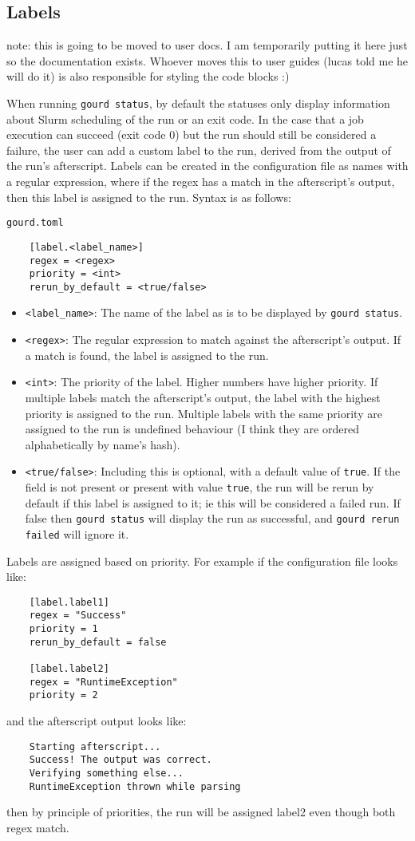 \subsection{Labels}
note: this is going to be moved to user docs.
I am temporarily putting it here just so the documentation exists.
Whoever moves this to user guides (lucas told me he will do it) is also responsible for styling the code blocks :)

When running \verb|gourd status|, by default the statuses only display information about Slurm scheduling of the run or an exit code.
In the case that a job execution can succeed (exit code 0) but the run should still be considered a failure, the user can add a custom label to the run, derived from the output of the run's afterscript.
Labels can be created in the configuration file as names with a regular expression, where if the regex has a match in the afterscript's output, then this label is assigned to the run.
Syntax is as follows:

\texttt{gourd.toml}
\begin{verbatim}
    [label.<label_name>]
    regex = <regex>
    priority = <int>
    rerun_by_default = <true/false>
\end{verbatim}
\begin{itemize}
    \item \verb|<label_name>|: The name of the label as is to be displayed by \verb|gourd status|.
    \item \verb|<regex>|: The regular expression to match against the afterscript's output.
    If a match is found, the label is assigned to the run.
    \item \verb|<int>|: The priority of the label.
    Higher numbers have higher priority.
    If multiple labels match the afterscript's output, the label with the highest priority is assigned to the run.
    Multiple labels with the same priority are assigned to the run is undefined behaviour (I think they are ordered alphabetically by name's hash).
    \item \verb|<true/false>|: Including this is optional, with a default value of \verb|true|.
    If the field is not present or present with value \verb|true|, the run will be rerun by default if this label is assigned to it; ie this will be considered a failed run.
    If false then \verb|gourd status| will display the run as successful, and \verb|gourd rerun failed| will ignore it.
\end{itemize}
Labels are assigned based on priority.
For example if the configuration file looks like:
\begin{verbatim}
    [label.label1]
    regex = "Success"
    priority = 1
    rerun_by_default = false

    [label.label2]
    regex = "RuntimeException"
    priority = 2
\end{verbatim}
and the afterscript output looks like:
\begin{verbatim}
    Starting afterscript...
    Success! The output was correct.
    Verifying something else...
    RuntimeException thrown while parsing
\end{verbatim}
then by principle of priorities, the run will be assigned label2 even though both regex match.